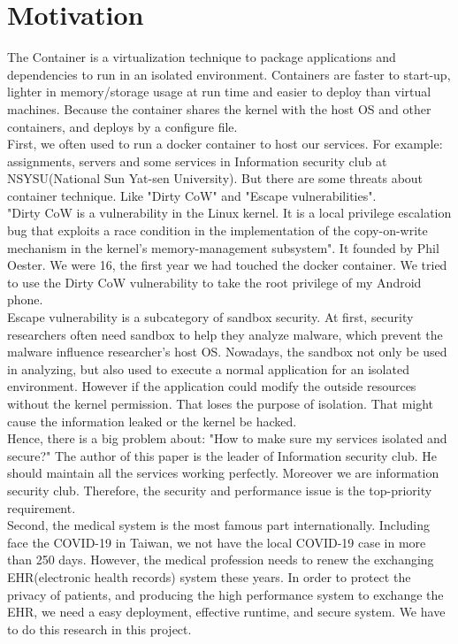 \documentclass[12pt,a4paper,oneside]{IEEEconf}
\begin{document}
\section{Motivation}
The Container is a virtualization technique to package applications and dependencies to run in
an isolated environment. Containers are faster to start-up, lighter in memory/storage usage
at run time and easier to deploy than virtual machines. Because the container shares the
kernel with the host OS and other containers, and deploys by a configure file.\\
First, we often used to run a docker container to host our services. For example: assignments,
servers and some services in Information security club at NSYSU(National Sun Yat-sen University).
But there are some threats about container technique. Like "Dirty CoW\cite{Dirty_CoW}"
and "Escape vulnerabilities".\\
"Dirty CoW is a vulnerability in the Linux kernel. It is a local privilege escalation bug
that exploits a race condition in the implementation of the copy-on-write mechanism in the
kernel's memory-management subsystem"\cite{Dirty_CoW_wiki}. It founded by Phil Oester. We
were 16, the first year we had touched the docker container. We tried to use the Dirty CoW
vulnerability to take the root privilege of my Android phone.\\
Escape vulnerability is a subcategory of sandbox security. At first, security researchers often
need sandbox to help they analyze malware, which prevent the malware influence researcher's
host OS. Nowadays, the sandbox not only be used in analyzing, but also used to execute a
normal application for an isolated environment. However if the application could modify the
outside resources without the kernel permission. That loses the purpose of isolation. That
might cause the information leaked or the kernel be hacked.\\
Hence, there is a big problem about: "How to make sure my services isolated and secure?" The
author of this paper is the leader of Information security club. He should maintain all
the services working perfectly. Moreover we are information security club. Therefore,
the security and performance issue is the top-priority requirement.\\
Second, the medical system is the most famous part internationally. Including face the COVID-19
in Taiwan, we not have the local COVID-19 case in more than 250 days.\cite{COVID19_CNN}
However, the medical profession needs to renew the exchanging EHR(electronic health records)
system these years. In order to protect the privacy of patients, and producing the high
performance system to exchange the EHR, we need a easy deployment, effective runtime, and
secure system. We have to do this research in this project.
\end{document}
